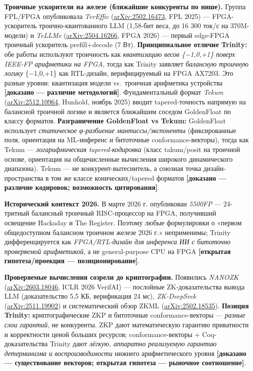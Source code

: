 \documentclass[
  russian,
]{article}
\begin{document}
\textbf{Троичные ускорители на железе (ближайшие конкуренты по нише).}
Группа FPL/FPGA опубликовала \emph{TerEffic}
(\href{https://arxiv.org/abs/2502.16473}{arXiv:2502.16473}, FPL 2025)
--- FPGA-ускоритель троично-квантованного LLM (1,58-бит веса, до 16 300
ток/с на 370M-модели) и \emph{TeLLMe}
(\href{https://arxiv.org/abs/2504.16266}{arXiv:2504.16266}, FPGA 2026)
--- первый edge-FPGA троичный ускоритель prefill+decode (7 Вт).
\textbf{Принципиальное отличие Trinity:} обе работы используют
троичность как \emph{квантизацию весов \{−1,0,+1\} поверх IEEE-FP
арифметики на FPGA}, тогда как Trinity заявляет \emph{балансную троичную
логику} \{−1,0,+1\} как RTL-дизайн, верифицируемый на FPGA AX7203. Это разные уровни: квантизация модели vs.~троичная
арифметика устройства \textbf{{[}доказано --- различие методологий{]}}.
Фундаментальный формат \emph{Tekum}
(\href{https://arxiv.org/abs/2512.10964}{arXiv:2512.10964}, Hunhold,
ноябрь 2025) вводит tapered-точность напрямую на балансной троичной
логике и является ближайшим соседом GoldenFloat по классу форматов.
\textbf{Разграничение GoldenFloat vs Tekum:} GoldenFloat использует
\emph{статическое φ-разбиение мантиссы/экспоненты} (фиксированные поля,
ориентация на ML-инференс и битоточные conformance-векторы), тогда как
Tekum --- \emph{логарифмическая tapered-кодировка} (класс takum/posit на
троичной основе, ориентация на общечисленные вычисления широкого
динамического диапазона). Tekum --- не конкурент-вытеснитель, а союзная
точка дизайн-пространства в том же классе конических/tapered форматов
\textbf{{[}доказано --- различие кодировок; возможность цитирования{]}}.

\textbf{Исторический контекст 2026.} В марте 2026 г. опубликован
\emph{5500FP} --- 24-тритный балансный троичный RISC-процессор на FPGA,
получивший освещение Hackaday и The Register. Поэтому любые формулировки
о «первом общедоступном балансном троичном железе 2026 г.» неприменимы;
Trinity дифференцируется как \emph{FPGA/RTL-дизайн для инференса ИИ с битоточно проверяемой арифметикой}, а не
general-purpose CPU на FPGA \textbf{{[}открытая гипотеза/проекция ---
позиционирование{]}}.

\textbf{Проверяемые вычисления созрели до криптографии.} Появились
\emph{NANOZK}
(\href{https://arxiv.org/abs/2603.18046}{arXiv:2603.18046}, ICLR 2026
VerifAI) --- послойные ZK-доказательства вывода LLM (доказательство 5,5
КБ, верификация 24 мс), \emph{ZK-DeepSeek}
(\href{https://arxiv.org/abs/2511.19902}{arXiv:2511.19902}) и
систематический обзор ZKML
(\href{https://arxiv.org/abs/2502.18535}{arXiv:2502.18535}).
\textbf{Позиция Trinity:} криптографические ZKP и битоточные
conformance-векторы --- \emph{разные слои гарантий}, не конкуренты. ZKP
дают математическую гарантию приватности и корректности ценой больших
ресурсов; conformance-векторы + Coq-доказательства Trinity дают
\emph{лёгкую, аппаратно реализуемую гарантию детерминизма и
воспроизводимости} нижнего арифметического уровня \textbf{{[}доказано
--- существование векторов; открытая гипотеза --- рыночное
соотношение{]}}.
\end{document}
